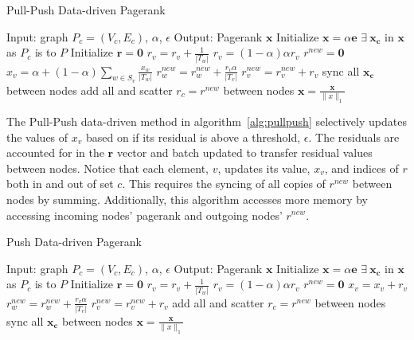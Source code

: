 \documentclass[letterpaper,12pt,onecolumn]{article}
\begin{document}
\begin{algorithm}
\caption{Pull-Push Data-driven Pagerank}
\label{alg:pullpush}
\begin{algorithmic}[1]
  \STATE Input: graph $P_{c} = (V_c, E_c)$, $\alpha$, $\epsilon$
  \STATE Output: Pagerank $\mathbf{x}$
  \STATE Initialize $\mathbf{x} = \alpha \mathbf{e}$
  \STATE $\exists  \medspace \mathbf{x_c}$ in $\mathbf{x}$ as $P_c$ is to $P$
  \STATE Initialize $\mathbf{r} = \mathbf{0}$
		\STATE $r_v = r_v + \frac{1}{|T_w|}$
	\ENDFOR
	\STATE $r_v = (1 - \alpha)\alpha r_v$
  \ENDFOR
	\STATE $r^{new} = \mathbf{0}$
			\STATE $x_{v} = \alpha + (1 - \alpha) \sum_{w \in S_v} \frac{x_{w}}{|T_w|} $
				\STATE $r_w^{new} = r_w^{new} + \frac{r_v \alpha}{|T_v|}$
			\ENDFOR
		\ELSE
			\STATE $r_v^{new} = r_v^{new} + r_v$
		\ENDIF
	\ENDFOR
	\STATE sync all $\mathbf{x_c}$ between nodes
	\STATE add all and scatter $ r_c = r^{new}$ between nodes
  \ENDWHILE
  \STATE $\mathbf{x} = \frac{\mathbf{x} }{\|x\|_{1}}$
\end{algorithmic}
\end{algorithm}

The Pull-Push data-driven method in algorithm~\ref{alg:pullpush} selectively updates the values of $x_v$ based on if its residual is above a threshold, $\epsilon$. The residuals are accounted for in the $\mathbf{r}$ vector and batch updated to transfer residual values between nodes. Notice that each element, $v$, updates its value, $x_v$, and indices of $r$ both in and out of set $c$. This requires the syncing of all copies of $r^{new}$ between nodes by summing. Additionally, this algorithm accesses more memory by accessing incoming nodes' pagerank and outgoing nodes' $r^{new}$.

\begin{algorithm}
\caption{Push Data-driven Pagerank}
\label{alg:push}
\begin{algorithmic}[1]
  \STATE Input: graph $P_{c} = (V_c, E_c)$, $\alpha$, $\epsilon$
  \STATE Output: Pagerank $\mathbf{x}$
  \STATE Initialize $\mathbf{x} = \alpha \mathbf{e}$
  \STATE $\exists  \medspace \mathbf{x_c}$ in $\mathbf{x}$ as $P_c$ is to $P$
  \STATE Initialize $\mathbf{r} = \mathbf{0}$
		\STATE $r_v = r_v + \frac{1}{|T_w|}$
	\ENDFOR
	\STATE $r_v = (1 - \alpha)\alpha r_v$
  \ENDFOR
	\STATE $r^{new} = \mathbf{0}$
			\STATE $x_{v} = x_{v} + r_v $
				\STATE $r_w^{new} = r_w^{new} + \frac{r_v \alpha}{|T_v|}$
			\ENDFOR
		\ELSE
			\STATE $r_v^{new} = r_v^{new} + r_v$
		\ENDIF
	\ENDFOR
	\STATE add all and scatter $ r_c = r^{new}$ between nodes
  \ENDWHILE
\STATE sync all $\mathbf{x_c}$ between nodes
  \STATE $\mathbf{x} = \frac{\mathbf{x} }{\|x\|_{1}}$
\end{algorithmic}
\end{algorithm}
\end{document}
